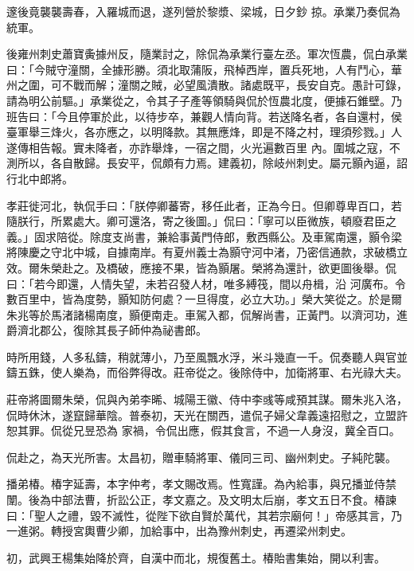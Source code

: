 \begin{pinyinscope}
 邃後竟襲襲壽春，入羅城而退，遂列營於黎漿、梁城，日夕鈔
 掠。承業乃奏侃為統軍。



 後雍州刺史蕭寶夤據州反，隨業討之，除侃為承業行臺左丞。軍次恆農，侃白承業曰：「今賊守潼關，全據形勝。須北取蒲阪，飛棹西岸，置兵死地，人有鬥心，華州之圍，可不戰而解；潼關之賊，必望風潰散。諸處既平，長安自克。愚計可錄，請為明公前驅。」承業從之，令其子子產等領騎與侃於恆農北度，便據石錐壁。乃班告曰：「今且停軍於此，以待步卒，兼觀人情向背。若送降名者，各自還村，侯臺軍舉三烽火，各亦應之，以明降款。其無應烽，即是不降之村，理須殄戮。」人遂傳相告報。實未降者，亦詐舉烽，一宿之間，火光遍數百里
 內。圍城之寇，不測所以，各自散歸。長安平，侃頗有力焉。建義初，除岐州刺史。屬元顥內逼，詔行北中郎將。



 孝莊徙河北，執侃手曰：「朕停卿蕃寄，移任此者，正為今日。但卿尊卑百口，若隨朕行，所累處大。卿可還洛，寄之後圖。」侃曰：「寧可以臣微族，頓廢君臣之義。」固求陪從。除度支尚書，兼給事黃門侍郎，敷西縣公。及車駕南還，顥令梁將陳慶之守北中城，自據南岸。有夏州義士為顥守河中渚，乃密信通款，求破橋立效。爾朱榮赴之。及橋破，應接不果，皆為顥屠。榮將為還計，欲更圖後舉。侃曰：「若今即還，人情失望，未若召發人材，唯多縛筏，間以舟楫，沿
 河廣布。令數百里中，皆為度勢，顥知防何處？一旦得度，必立大功。」榮大笑從之。於是爾朱兆等於馬渚諸楊南度，顥便南走。車駕入都，侃解尚書，正黃門。以濟河功，進爵濟北郡公，復除其長子師仲為祕書郎。



 時所用錢，人多私鑄，稍就薄小，乃至風飄水浮，米斗幾直一千。侃奏聽人與官並鑄五銖，使人樂為，而俗弊得改。莊帝從之。後除侍中，加衛將軍、右光祿大夫。



 莊帝將圖爾朱榮，侃與內弟李晞、城陽王徽、侍中李彧等咸預其謀。爾朱兆入洛，侃時休沐，遂竄歸華陰。普泰初，天光在關西，遣侃子婦父韋義遠招慰之，立盟許恕其罪。侃從兄昱恐為
 家禍，令侃出應，假其食言，不過一人身沒，冀全百口。



 侃赴之，為天光所害。太昌初，贈車騎將軍、儀同三司、幽州刺史。子純陀襲。



 播弟椿。椿字延壽，本字仲考，孝文賜改焉。性寬謹。為內給事，與兄播並侍禁闈。後為中部法曹，折訟公正，孝文嘉之。及文明太后崩，孝文五日不食。椿諫曰：「聖人之禮，毀不滅性，從陛下欲自賢於萬代，其若宗廟何！」帝感其言，乃一進粥。轉授宮輿曹少卿，加給事中，出為豫州刺史，再遷梁州刺史。



 初，武興王楊集始降於齊，自漢中而北，規復舊土。椿貽書集始，開以利害。




\end{pinyinscope}
